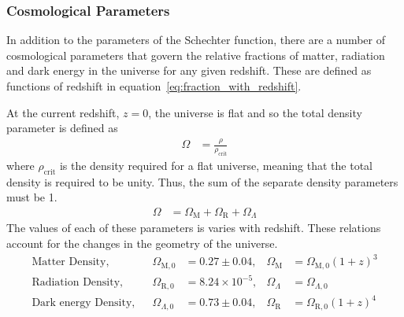 	\subsubsection{Cosmological Parameters} %
	\label{ssub:cosmological_parameters}
		In addition to the parameters of the Schechter function, there are a number of cosmological parameters that govern the relative fractions of matter, radiation and dark energy in the universe for any given redshift. These are defined as functions of redshift in equation~\ref{eq:fraction_with_redshift}.

		At the current redshift, $z=0$, the universe is flat and so the total density parameter is defined as
		\begin{align}
			\Omega &= \frac{\rho}{\rho_{\text{crit}}}
		\end{align}
		where $\rho_{\text{crit}}$ is the density required for a flat universe, meaning that the total density is required to be unity. Thus, the sum of the separate density parameters must be 1.
		\begin{align}
			\Omega &= \Omega_\text{M} + \Omega_\text{R} + \Omega_\Lambda \label{eq:fraction_with_redshift}
		\end{align}
		The values of each of these parameters is varies with redshift. These relations account for the changes in the geometry of the universe.
		\begin{align}
			\text{Matter Density}, 		&& \Omega_{\text{M},0} 	&= 0.27\pm 0.04,			& \Omega_\text{M} &= \Omega_{\text{M},0}(1+z)^3\\
			\text{Radiation Density}, 	&& \Omega_{\text{R},0}	&= 8.24\times 10^{-5}, 	& \Omega_\Lambda  &= \Omega_{\Lambda,0}\\
			\text{Dark energy Density}, 	&& \Omega_{\Lambda,0} 	&= 0.73\pm 0.04,			& \Omega_\text{R} &= \Omega_{\text{R},0}(1+z)^4
		\end{align}

